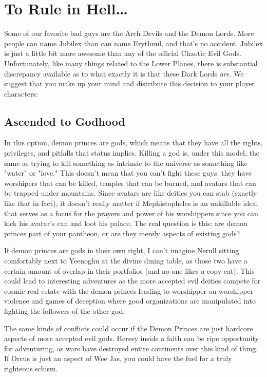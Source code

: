\section{To Rule in Hell\ldots}

Some of our favorite bad guys are the Arch Devils and the Demon Lords. More people can name Jubilex than can name Erythnul, and that's no accident. Jubilex is just a little bit more awesome than any of the official Chaotic Evil Gods. Unfortunately, like many things related to the Lower Planes, there is substantial discrepancy available as to what exactly it is that these Dark Lords \textit{are}. We suggest that you make up your mind and distribute this decision to your player characters:

\subsection{Ascended to Godhood}

In this option, demon princes are gods, which means that they have all the rights, privileges, and pitfalls that status implies. Killing a god is, under this model, the same as trying to kill something as intrinsic to the universe as something like "water" or "love." This doesn't mean that you can't fight these guys: they have worshipers that can be killed, temples that can be burned, and avatars that can be trapped under mountains. Since avatars are like deities you can stab (exactly like that in fact), it doesn't really matter if Mephistopheles is an unkillable ideal that serves as a focus for the prayers and power of his worshippers since you can kick his avatar's can and loot his palace. The real question is this: are demon princes part of your pantheon, or are they merely aspects of existing gods?

If demon princes are gods in their own right, I can't imagine Nerull sitting comfortably next to Yeenoghu at the divine dining table, as those two have a certain amount of overlap in their portfolios (and no one likes a copy-cat). This could lead to interesting adventures as the more accepted evil deities compete for cosmic real estate with the demon princes leading to worshipper on worshipper violence and games of deception where good organizations are manipulated into fighting the followers of the other god.

The same kinds of conflicts could occur if the Demon Princes are just hardcore aspects of more accepted evil gods. Heresy inside a faith can be ripe opportunity for adventuring, as wars have destroyed entire continents over this kind of thing. If Orcus is just an aspect of Wee Jas, you could have the fuel for a truly righteous schism.

